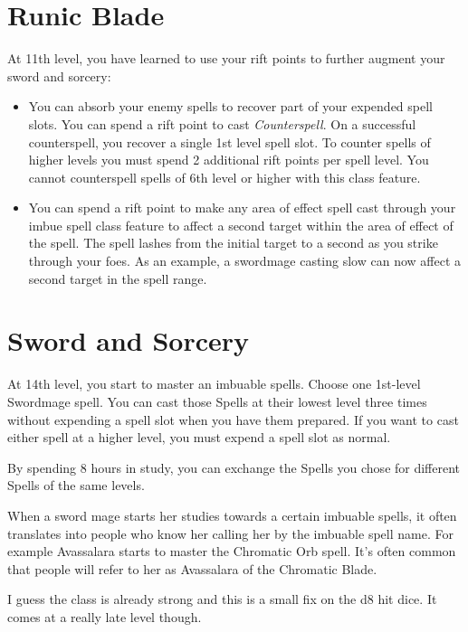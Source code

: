\begin{multicols*}{2}
\section*{Runic Blade}


At 11th level, you have learned to use your rift points to further augment your sword and sorcery:

\begin{itemize}
    \item You can absorb your enemy spells to recover part of your expended spell slots.
    You can spend a rift point to cast \textit{Counterspell}.  On a successful counterspell, you recover a single 1st level spell slot. To counter spells of higher levels you must spend 2 additional rift points per spell level. 
    You cannot counterspell spells of 6th level or higher with this class feature.
    \item You can spend a rift point to make any area of effect spell cast through your imbue spell class feature to affect a second target within the area of effect of the spell. The spell lashes from the initial target to a second as you strike through your foes. As an example, a swordmage casting slow can now affect a second target in the spell range.
\end{itemize}


\section*{Sword and Sorcery}


At 14th level, you start to master an imbuable spells. Choose one 1st-level Swordmage spell. You can cast those Spells at their lowest level three times without expending a spell slot when you have them prepared. If you want to cast either spell at a higher level, you must expend a spell slot as normal.

By spending 8 hours in study, you can exchange the Spells you chose for different Spells of the same levels.

When a sword mage starts her studies towards a certain imbuable spells, it often translates into people who know her calling her by the imbuable spell name. For example Avassalara starts to master the Chromatic Orb spell. It's often common that people will refer to her as Avassalara of the Chromatic Blade.


\smallskip

{\color{red} I guess the class is already strong and this is a small fix on the d8 hit dice. It comes at a really late level though.  }




\end{multicols*}
